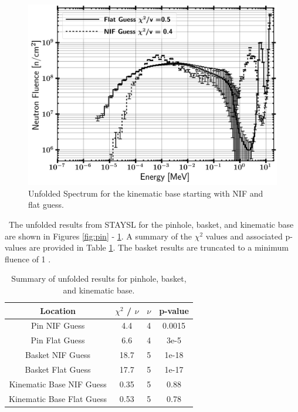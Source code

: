 \documentclass[journal]{IEEEtran}
\let\MYoriglatexcaption\caption
\renewcommand{\caption}[2][\relax]{\MYoriglatexcaption[#2]{#2}}
\begin{document}
\begin{figure}[t!]
		\label{fig:bask}
		\vskip 0.9cm
		\includegraphics[width=\linewidth]{Figures/KBASBothLog.png}
		\caption{Unfolded Spectrum for the kinematic base starting with NIF and flat guess.}
		\label{fig:kbas}
		
	\end{figure}
	\ The unfolded results from STAYSL for the pinhole, basket, and kinematic base are shown in Figures \ref{fig:pin} - \ref{fig:kbas}. 
A summary of the $\chi^{2}$ values and associated p-values are provided in Table \ref{Table:STAY}. 
The basket results are truncated to a minimum fluence of 1 . 
	
	\begin{table}[h]
		\caption{Summary of unfolded results for pinhole, basket, and kinematic base.}
		\label{Table:STAY}
		\centering
		\begin{tabular}{|c|c|c|c|}
			\hline
			Location & $\chi^{2}$ / $\nu$ & $\nu$ & p-value \\ \hline
			Pin NIF Guess & 4.4 & 4 & 0.0015 \\ \hline
			Pin Flat Guess & 6.6 & 4 & 3e-5 \\ \hline
			Basket NIF Guess & 18.7 & 5 & 1e-18 \\ \hline
			Basket Flat Guess & 17.7 & 5 & 1e-17 \\ \hline
			Kinematic Base NIF Guess & 0.35 & 5 & 0.88 \\ \hline
			Kinematic Base Flat Guess & 0.53 & 5 & 0.78 \\ \hline
		\end{tabular}
	\end{table}
	
\end{document}
